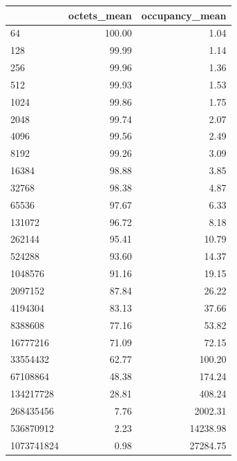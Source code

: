 \begin{tabular}{lrr}
\toprule
 & octets_mean & occupancy_mean \\
\midrule
64 & 100.00 & 1.04 \\
128 & 99.99 & 1.14 \\
256 & 99.96 & 1.36 \\
512 & 99.93 & 1.53 \\
1024 & 99.86 & 1.75 \\
2048 & 99.74 & 2.07 \\
4096 & 99.56 & 2.49 \\
8192 & 99.26 & 3.09 \\
16384 & 98.88 & 3.85 \\
32768 & 98.38 & 4.87 \\
65536 & 97.67 & 6.33 \\
131072 & 96.72 & 8.18 \\
262144 & 95.41 & 10.79 \\
524288 & 93.60 & 14.37 \\
1048576 & 91.16 & 19.15 \\
2097152 & 87.84 & 26.22 \\
4194304 & 83.13 & 37.66 \\
8388608 & 77.16 & 53.82 \\
16777216 & 71.09 & 72.15 \\
33554432 & 62.77 & 100.20 \\
67108864 & 48.38 & 174.24 \\
134217728 & 28.81 & 408.24 \\
268435456 & 7.76 & 2002.31 \\
536870912 & 2.23 & 14238.98 \\
1073741824 & 0.98 & 27284.75 \\
\bottomrule
\end{tabular}
